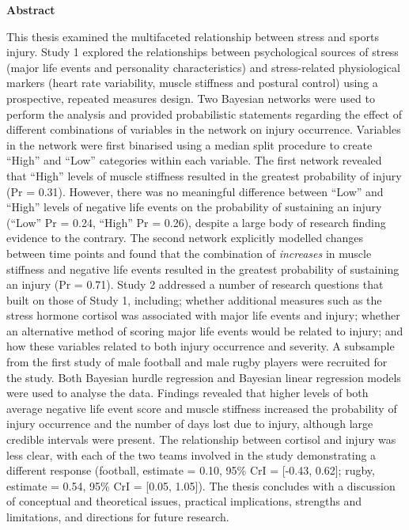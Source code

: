 \documentclass[man,floatsintext]{apa6}
\begin{document}


\clearpage

\begin{center}
\textbf{Abstract}
\end{center}

\bigskip
{}

This thesis examined the multifaceted relationship between stress and sports injury.
Study 1 explored the relationships between psychological sources of stress (major life events and personality characteristics) and stress-related physiological markers (heart rate variability, muscle stiffness and postural control) using a prospective, repeated measures design.
Two Bayesian networks were used to perform the analysis and provided probabilistic statements regarding the effect of different combinations of variables in the network on injury occurrence.
Variables in the network were first binarised using a median split procedure to create \enquote{High} and \enquote{Low} categories within each variable.
The first network revealed that \enquote{High} levels of muscle stiffness resulted in the greatest probability of injury (Pr = 0.31).
However, there was no meaningful difference between \enquote{Low} and \enquote{High} levels of negative life events on the probability of sustaining an injury (\enquote{Low} Pr = 0.24, \enquote{High} Pr = 0.26), despite a large body of research finding evidence to the contrary.
The second network explicitly modelled changes between time points and found that the combination of \emph{increases} in muscle stiffness and negative life events resulted in the greatest probability of sustaining an injury (Pr = 0.71).
Study 2 addressed a number of research questions that built on those of Study 1, including; whether additional measures such as the stress hormone cortisol was associated with major life events and injury; whether an alternative method of scoring major life events would be related to injury; and how these variables related to both injury occurrence and severity.
A subsample from the first study of male football and male rugby players were recruited for the study.
Both Bayesian hurdle regression and Bayesian linear regression models were used to analyse the data.
Findings revealed that higher levels of both average negative life event score and muscle stiffness increased the probability of injury occurrence and the number of days lost due to injury, although large credible intervals were present.
The relationship between cortisol and injury was less clear, with each of the two teams involved in the study demonstrating a different response (football, estimate = 0.10, 95\% CrI = {[}-0.43, 0.62{]}; rugby, estimate = 0.54, 95\% CrI = {[}0.05, 1.05{]}).
The thesis concludes with a discussion of conceptual and theoretical issues, practical implications, strengths and limitations, and directions for future research.
\end{document}
